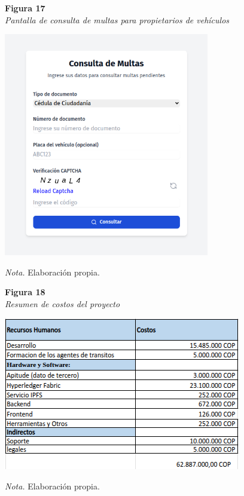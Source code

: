 \documentclass[
    letterpaper, 
    man,   
    spanish,
    12pt,
    donotrepeattitle,
    floatsintext,
    hidelinks %
]{apa7}
\begin{document}
\begin{figure}[htbp]
    \begin{flushleft}
        \textbf{Figura 17}\\
        \textit{Pantalla de consulta de multas para propietarios de vehículos}
    \end{flushleft}
    \centering
    \includegraphics[width=0.8\textwidth]{Images/UI5.png}
    \vspace{0.5em}
    \begin{flushleft}
        \textit{Nota.} Elaboración propia.
    \end{flushleft}
    \label{fig:consulta_multas_propietario}
\end{figure}

\begin{figure}[htbp]
    \begin{flushleft}
        \textbf{Figura 18}\\
        \textit{Resumen de costos del proyecto}
    \end{flushleft}
    \centering
    \includegraphics[width=\textwidth]{Images/costos1.png}
    \vspace{0.5em}
    \begin{flushleft}
        \textit{Nota.} Elaboración propia.
    \end{flushleft}
    \label{fig:costos1}
\end{figure}
\end{document}
